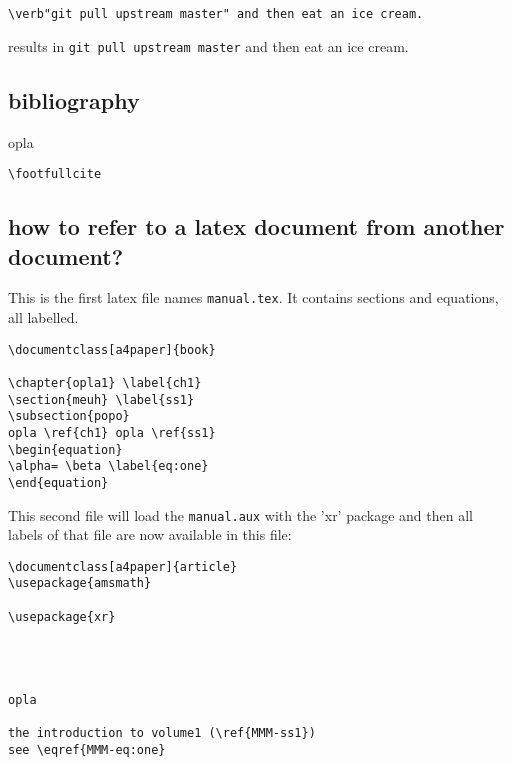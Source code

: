 \begin{verbatim}
\verb"git pull upstream master" and then eat an ice cream.
\end{verbatim}
results in
\verb"git pull upstream master" and then eat an ice cream.

\subsection*{bibliography}

opla

\verb|\footfullcite|


\subsection*{how to refer to a latex document from another document?}

This is the first latex file names {\tt manual.tex}. It contains sections and equations, all labelled.
\begin{verbatim}
\documentclass[a4paper]{book}

\chapter{opla1} \label{ch1}
\section{meuh} \label{ss1}
\subsection{popo}
opla \ref{ch1} opla \ref{ss1}
\begin{equation}
\alpha= \beta \label{eq:one}
\end{equation}

\end{verbatim}

This second file will load the {\tt manual.aux} with the 'xr' package
and then all labels of that file are now available in this file:

\begin{verbatim}
\documentclass[a4paper]{article}
\usepackage{amsmath}

\usepackage{xr}




opla

the introduction to volume1 (\ref{MMM-ss1})
see \eqref{MMM-eq:one}


\end{verbatim}

